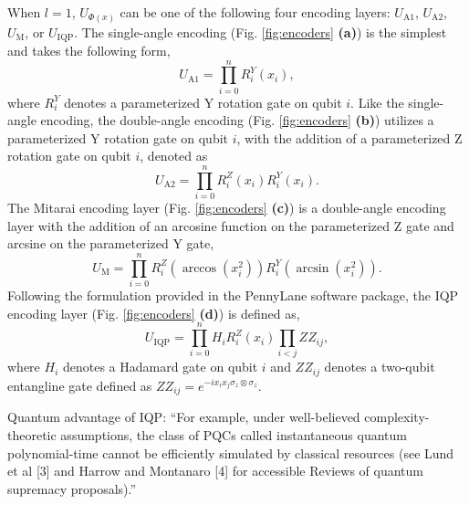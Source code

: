 \documentclass[journal=jacsat,manuscript=article]{achemso}
\begin{document}

When $l=1$, $U_{\Phi(x)}$ can be one of the following four encoding layers: $U_{\text{A1}}$, $U_{\text{A2}}$, $U_{\text{M}}$, or $U_{\text{IQP}}$.
The single-angle encoding (Fig. \ref{fig:encoders} \textbf{(a)}) is the simplest and takes the following form,
\begin{equation}
	U_{\text{A1}} = \prod_{i=0}^{n} R^{Y}_{i}(x_{i}),
	\label{eq:A1}
\end{equation}
where $R^{Y}_{i}$ denotes a parameterized Y rotation gate on qubit $i$.
Like the single-angle encoding, the double-angle encoding (Fig. \ref{fig:encoders} \textbf{(b)}) utilizes a parameterized Y rotation gate on qubit $i$, with the addition of a parameterized Z rotation gate on qubit $i$, denoted as
\begin{equation}
	U_{\text{A2}} = \prod_{i=0}^{n}  R^{Z}_{i}(x_{i}) R^{Y}_{i}(x_{i}).
	\label{eq:A2}
\end{equation}
The Mitarai encoding layer (Fig. \ref{fig:encoders} \textbf{(c)}) is a double-angle encoding layer with the addition of an arcosine function on the parameterized Z gate and arcsine on the parameterized Y gate,
\begin{equation}
	U_{\text{M}}  = \prod_{i=0}^{n} R^{Z}_{i}(\arccos (x_{i}^{2})) R^{Y}_{i}(\arcsin (x_{i}^{2})).
	\label{eq:M}
\end{equation}
Following the formulation provided in the PennyLane\cite{bergholm_pennylane_2022} software package, the IQP encoding layer (Fig. \ref{fig:encoders} \textbf{(d)}) is defined as,
\begin{equation}
	U_{\text{IQP}}  = \prod_{i=0}^{n} H_{i} R^{Z}_{i}(x_{i})  \prod_{i<j} ZZ_{ij},
	\label{eq:IQP}
\end{equation}
where $H_{i}$ denotes a Hadamard gate on qubit $i$ and $ZZ_{ij}$ denotes a two-qubit entangline gate defined as $ZZ_{ij} = e^{-i x_{i} x_{j} \sigma_{z} \otimes \sigma_{z}}$.

Quantum advantage of IQP: ``For example, under well-believed complexity-theoretic assumptions, the class of PQCs called instantaneous quantum polynomial-time cannot be efficiently simulated by classical resources (see Lund et al [3] and Harrow and Montanaro [4] for accessible Reviews of quantum supremacy proposals).''\cite{benedetti_parameterized_2019}  
  
\end{document}
